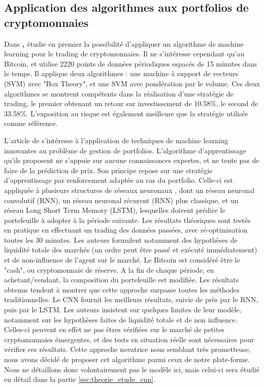\documentclass[a4paper, 10pt]{article}
\begin{document}
\subsection{Application des algorithmes aux portfolios de cryptomonnaies}
\label{sec:review_application}

Dans \textbf{, \citet{Zbikowski2016}} étudie en premier la possibilité d'appliquer un algorithme de machine learning pour le trading de cryptomonnaies. Il ne s'intéresse cependant qu'au Bitcoin, et utilise 2220 points de données périodiques espacés de 15 minutes dans le temps. Il applique deux algorithmes : une machine à support de vecteurs (SVM) avec "Box Theory", et une SVM avec pondération par le volume. Ces deux algorithmes se montrent compétents dans la réalisation d'une stratégie de trading, le premier obtenant un retour sur investissement de 10.58\%, le second de 33.58\%. L'exposition au risque est également meilleure que la stratégie utilisée comme référence.

L'article de \textbf{\citet{Jiang2017} } s'intéresse à l'application de techniques de machine learning innovantes au problème de gestion de portfolios. L'algorithme d'apprentissage qu'ils proposent ne s'appuie sur aucune connaissances expertes, et ne tente pas de faire de la prédiction de prix. Son principe repose sur une stratégie d'apprentissage par renforcement adaptée au cas du portfolio. Celle-ci est appliquée à plusieurs structures de réseaux neuronaux , dont un réseau neuronal convolutif (RNN), un réseau neuronal récurent (RNN) plus classique, et un réseau Long Short Term Memory (LSTM), lesquelles doivent prédire le portefeuille à adopter à la période suivante. Les résultats théoriques sont testés en pratique en effectuant un trading des données passées, avec ré-optimisation toutes les 30 minutes. Les auteurs formulent notamment des hypothèses de liquidité totale des marchés (un ordre peut être passé et exécuté immédiatement) et de non-influence de l'agent sur le marché. Le Bitcoin est considéré être le "cash", ou cryptomonnaie de réserve. A la fin de chaque période, en achetant/vendant, la composition du portefeuille est modifiée. Les résultats obtenus tendent à montrer que cette approche surpasse toutes les méthodes traditionnelles. Le CNN fournit les meilleurs résultats, suivie de près par le RNN, puis par le LSTM. Les auteurs insistent sur quelques limites de leur modèle, notamment sur les hypothèses faites de liquidité totale et de non influence. Celles-ci peuvent en effet ne pas êtres vérifiées sur le marché de petites cryptomonnaies émergentes, et des tests en situation réelle sont nécessaires pour vérifier ces résultats. Cette approche novatrice nous semblant très prometteuse, nous avons décidé de proposer cet algorithme parmi ceux de notre plate-forme. Nous ne détaillons donc volontairement pas le modèle ici, mais celui-ci sera étudié en détail dans la partie \ref{sec:theorie_etude_cnn}. 
\end{document}
